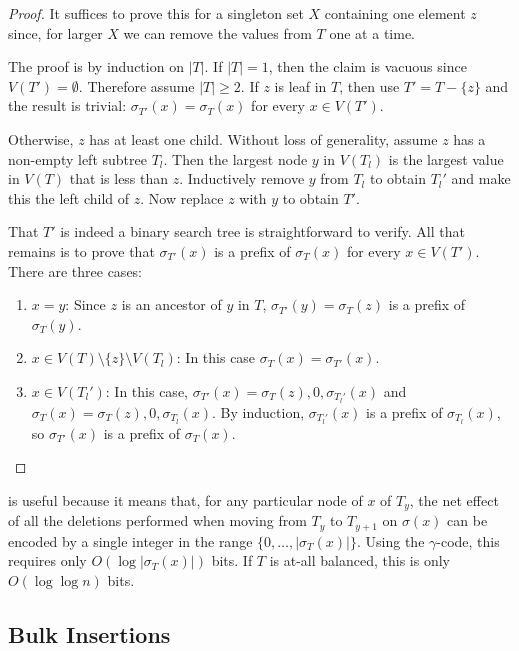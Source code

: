 \documentclass[kpfonts]{patmorin}
\begin{document}
\begin{proof}
  It suffices to prove this for a singleton set $X$ containing one element $z$ since, for larger $X$ we can remove the values from $T$ one at a time.  
  
  The proof is by induction on $|T|$. If $|T|=1$, then the claim is vacuous since $V(T')=\emptyset$.  Therefore assume $|T|\ge 2$.  If $z$ is leaf in $T$, then use $T'=T-\{z\}$ and the result is trivial: $\sigma_{T'}(x)=\sigma_T(x)$ for every $x\in V(T')$.  
  
  Otherwise, $z$ has at least one child.  Without loss of generality, assume $z$ has a non-empty left subtree $T_l$.  Then the largest node $y$ in $V(T_l)$ is the largest value in $V(T)$ that is less than $z$. Inductively remove $y$ from $T_l$ to obtain $T_l'$ and make this the left child of $z$.  Now replace $z$ with $y$ to obtain $T'$.  
  
  That $T'$ is indeed a binary search tree is straightforward to verify.  All that remains is to prove that $\sigma_{T'}(x)$ is a prefix of $\sigma_T(x)$ for every $x\in V(T')$. There are three cases:
  \begin{enumerate}
    \item $x=y$: Since $z$ is an ancestor of $y$ in $T$, $\sigma_{T'}(y)=\sigma_T(z)$ is a prefix of $\sigma_T(y)$.  
    
    \item $x\in V(T)\setminus\{z\}\setminus V(T_l)$: In this case $\sigma_T(x)=\sigma_{T'}(x)$.  
    
    \item $x\in V(T_l')$: In this case, $\sigma_{T'}(x)=\sigma_{T}(z),0,\sigma_{T_l'}(x)$ and $\sigma_T(x)=\sigma_{T}(z),0,\sigma_{T_l}(x)$.  By induction, $\sigma_{T_l'}(x)$ is a prefix of $\sigma_{T_l}(x)$, so $\sigma_{T'}(x)$ is a prefix of $\sigma_T(x)$. \qedhere
  \end{enumerate}
\end{proof}

 is useful because it means that, for any particular node of $x$ of $T_y$, the net effect of all the deletions performed when moving from $T_y$ to $T_{y+1}$ on $\sigma(x)$ can be encoded by a single integer in the range $\{0,\ldots,|\sigma_T(x)|\}$.  Using the $\gamma$-code, this requires only $O(\log |\sigma_T(x)|)$ bits.  If $T$ is at-all balanced, this is only $O(\log\log n)$ bits.

\subsection{Bulk Insertions}
\end{document}

